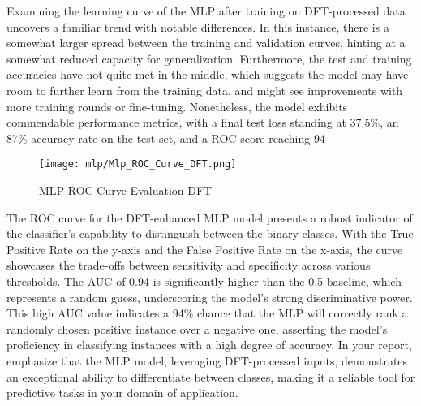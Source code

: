 Examining the learning curve of the MLP after training on DFT-processed data uncovers a familiar trend with notable differences. In this instance, there is a somewhat larger spread between the training and validation curves, hinting at a somewhat reduced capacity for generalization. Furthermore, the test and training accuracies have not quite met in the middle, which suggests the model may have room to further learn from the training data, and might see improvements with more training rounds or fine-tuning. Nonetheless, the model exhibits commendable performance metrics, with a final test loss standing at 37.5\%, an 87\% accuracy rate on the test set, and a ROC score reaching 94%

\begin{figure}[H] 
  \centering
  \texttt{[image: mlp/Mlp\_ROC\_Curve\_DFT.png]}
  \caption{MLP ROC Curve Evaluation DFT}\label{fig:Mlp_ROC_Curve_DFT}
\end{figure}

The ROC curve for the DFT-enhanced MLP model presents a robust indicator of the classifier's capability to distinguish between the binary classes. With the True Positive Rate on the y-axis and the False Positive Rate on the x-axis, the curve showcases the trade-offs between sensitivity and specificity across various thresholds. The AUC of 0.94 is significantly higher than the 0.5 baseline, which represents a random guess, underscoring the model's strong discriminative power. This high AUC value indicates a 94\% chance that the MLP will correctly rank a randomly chosen positive instance over a negative one, asserting the model's proficiency in classifying instances with a high degree of accuracy. In your report, emphasize that the MLP model, leveraging DFT-processed inputs, demonstrates an exceptional ability to differentiate between classes, making it a reliable tool for predictive tasks in your domain of application.
